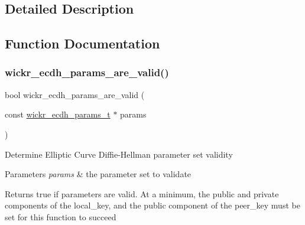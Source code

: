 \subsection{Detailed Description}


\subsection{Function Documentation}
\mbox{\label{group__wickr__ecdh__params_ga801f1bfae11ac0c94d59bf9dd58f78aa}} 
\subsubsection{\texorpdfstring{wickr\+\_\+ecdh\+\_\+params\+\_\+are\+\_\+valid()}{wickr\_ecdh\_params\_are\_valid()}}
{\footnotesize\ttfamily bool wickr\+\_\+ecdh\+\_\+params\+\_\+are\+\_\+valid (\begin{DoxyParamCaption}\item[{const \mbox{\hyperlink{structwickr__ecdh__params}{wickr\+\_\+ecdh\+\_\+params\+\_\+t}} $\ast$}]{params }\end{DoxyParamCaption})}

Determine Elliptic Curve Diffie-\/\+Hellman parameter set validity


\begin{DoxyParams}{Parameters}
{\em params} & the parameter set to validate \\
\hline
\end{DoxyParams}
\begin{DoxyReturn}{Returns}
true if parameters are valid. At a minimum, the public and private components of the \textquotesingle{}local\+\_\+key\textquotesingle{}, and the public component of the \textquotesingle{}peer\+\_\+key\textquotesingle{} must be set for this function to succeed 
\end{DoxyReturn}
\mbox{\label{group__wickr__ecdh__params_ga016f2b643f2636c05ed72bc08a0314f0}} 
